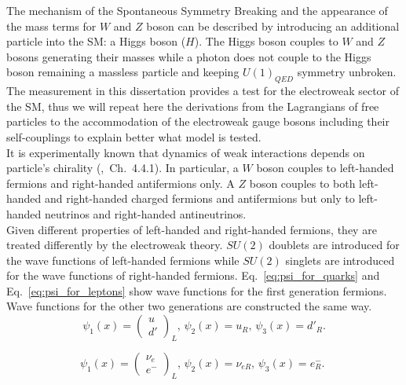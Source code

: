 The mechanism of the Spontaneous Symmetry Breaking and the appearance of the mass terms for $W$ and $Z$ boson can be described by introducing an additional particle into the SM: a Higgs boson ($H$). The Higgs boson couples to $W$ and $Z$ bosons generating their masses while a photon does not couple to the Higgs boson remaining a massless particle and keeping $U(1)_{QED}$ symmetry unbroken.\\

The measurement in this dissertation provides a test for the electroweak sector of the SM, thus we will repeat here the derivations from the Lagrangians of free particles to the accommodation of the electroweak gauge bosons including their self-couplings to explain better what model is tested.\\

It is experimentally known that dynamics of weak interactions depends on particle's chirality (\cite{ref_Griffiths},~Ch.~4.4.1). In particular, a $W$ boson couples to left-handed fermions and right-handed antifermions only. A $Z$ boson couples to both left-handed and right-handed charged fermions and antifermions but only to left-handed neutrinos and right-handed antineutrinos. \\

Given different properties of left-handed and right-handed fermions, they are treated differently by the electroweak theory. $SU(2)$ doublets are introduced for the wave functions of left-handed fermions while $SU(2)$ singlets are introduced for the wave functions of right-handed fermions. Eq.~\ref{eq:psi_for_quarks} and Eq.~\ref{eq:psi_for_leptons} show wave functions for the first generation fermions. Wave functions for the other two generations are constructed the same way.\\ 
 
\begin{equation}\label{eq:psi_for_quarks}
\psi_1(x)=\begin{pmatrix} u \\ d' \end{pmatrix}_L \text{, } \psi_2(x)=u_R \text{, } \psi_3(x)=d'_R \text{.}
\end{equation}

\begin{equation}\label{eq:psi_for_leptons}
\psi_1(x)=\begin{pmatrix} \nu_e \\ e^- \end{pmatrix}_L \text{, } \psi_2(x)=\nu_{eR} \text{, } \psi_3(x)=e^-_R \text{. }
\end{equation}

